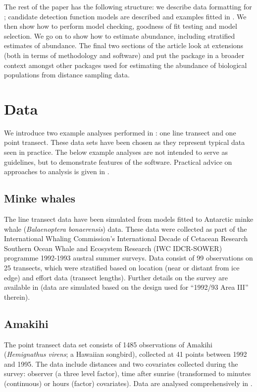\documentclass[article]{jss}\usepackage[]{graphicx}\usepackage[]{color}
\begin{document}
The rest of the paper has the following structure: we describe data formatting for ; candidate detection function models are described and examples fitted in . We then show how to perform model checking, goodness of fit testing and model selection. We go on to show how to estimate abundance, including stratified estimates of abundance. The final two sections of the article look at extensions (both in terms of methodology and software) and put the package in a broader context amongst other  packages used for estimating the abundance of biological populations from distance sampling data.

\section{Data}

We introduce two example analyses performed in : one line transect and one point transect. These data sets have been chosen as they represent typical data seen in practice. The below example analyses are not intended to serve as guidelines, but to demonstrate features of the software. Practical advice on approaches to analysis is given in \cite{Thomas:2010cf}.

\subsection{Minke whales}

The line transect data have been simulated from models fitted to Antarctic minke whale (\textit{Balaenoptera bonaerensis}) data. These data were collected as part of the International Whaling Commission's International Decade of Cetacean Research Southern Ocean Whale and Ecosystem Research (IWC IDCR-SOWER) programme 1992-1993 austral summer surveys. Data consist of 99 observations on 25 transects, which were stratified based on location (near or distant from ice edge) and effort data (transect lengths). Further details on the survey are available in \cite{Branch:2001ua} (data are simulated based on the design used for ``1992/93 Area III'' therein).

\subsection{Amakihi}

The point transect data set consists of 1485 observations of Amakihi (\textit{Hemignathus virens}; a Hawaiian songbird), collected at 41 points between 1992 and 1995. The data include distances and two covariates collected during the survey: observer (a three level factor), time after sunrise (transformed to minutes (continuous) or hours (factor) covariates). Data are analysed comprehensively in \cite{Marques:2007ey}.
\end{document}
